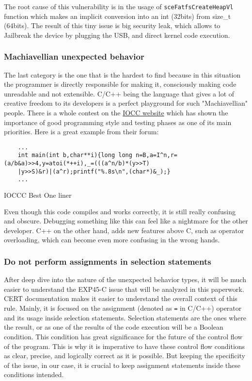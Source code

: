 The root cause of this vulnerability is in the usage of  \lstinline{sceFatfsCreateHeapVl} function which makes an implicit conversion into an int (32bits) from size\_t (64bits). The result of this tiny issue is big security leak, which allows to Jailbreak the device by plugging the USB, and direct kernel code execution. 

\subsubsection{Machiavellian unexpected behavior}
The last category is the one that is the hardest to find because in this situation the programmer is directly responsible for making it, consciously making code unreadable and not extensible. C/C++ being the language that gives a lot of creative freedom to its developers is a perfect playground for such "Machiavellian" people. There is a whole contest on the \href{https://www.ioccc.org/}{IOCC website} which has shown the importance of good programming style and testing phases as one of its main priorities. Here is a great example from their forum:  

\begin{listing}[h]
\begin{verbatim}
    ...
    int main(int b,char**i){long long n=B,a=I^n,r=(a/b&a)>>4,y=atoi(*++i),_=(((a^n/b)*(y>>T)
    |y>>S)&r)|(a^r);printf("%.8s\n",(char*)&_);}
    ...
\end{verbatim}
\caption{IOCCC Best One liner}
\label{code:mach-one-liner}
\end{listing}

Even though this code compiles and works correctly, it is still really confusing and obscure. Debugging something like this can feel like a nightmare for the other developer. C++ on the other hand, adds new features above C, such as operator overloading, which can become even more confusing in the wrong hands. 


\subsubsection{Do not perform assignments in selection statements}

After deep dive into the nature of the unexpected behavior types, it will be much easier to understand the EXP45-C issue that will be analyzed in this paperwork. CERT documentation makes it easier to understand the overall context of this rule. Mainly, it is focused on the assignment (denoted as \lstinline{=} in C/C++) operator and its usage inside selection statements. Selection statements are the ones where the result, or as one of the results of the code execution will be a Boolean condition. This condition has great significance for the future of the control flow of the program. This is why it is imperative to have these control flow conditions as clear, precise, and logically correct as it is possible. But keeping the specificity of the issue, in our case, it is crucial to keep assignment statements inside these conditions intended.

